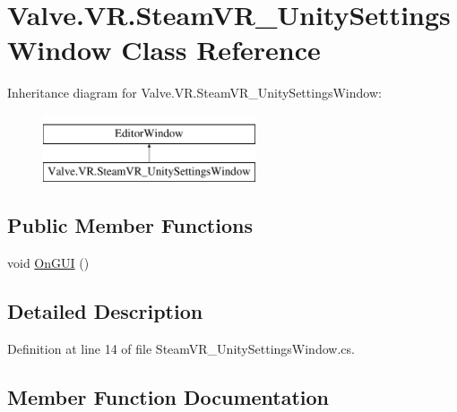 \hypertarget{class_valve_1_1_v_r_1_1_steam_v_r___unity_settings_window}{}\section{Valve.\+V\+R.\+Steam\+V\+R\+\_\+\+Unity\+Settings\+Window Class Reference}
\label{class_valve_1_1_v_r_1_1_steam_v_r___unity_settings_window}
Inheritance diagram for Valve.\+V\+R.\+Steam\+V\+R\+\_\+\+Unity\+Settings\+Window\+:\begin{figure}[H]
\begin{center}
\leavevmode
\includegraphics[height=2.000000cm]{class_valve_1_1_v_r_1_1_steam_v_r___unity_settings_window}
\end{center}
\end{figure}
\subsection*{Public Member Functions}
\begin{DoxyCompactItemize}
\item 
void \mbox{\hyperlink{class_valve_1_1_v_r_1_1_steam_v_r___unity_settings_window_af3cd22414b46f5f374a364db26880167}{On\+G\+UI}} ()
\end{DoxyCompactItemize}


\subsection{Detailed Description}


Definition at line 14 of file Steam\+V\+R\+\_\+\+Unity\+Settings\+Window.\+cs.



\subsection{Member Function Documentation}
\mbox{\label{class_valve_1_1_v_r_1_1_steam_v_r___unity_settings_window_af3cd22414b46f5f374a364db26880167}} 
